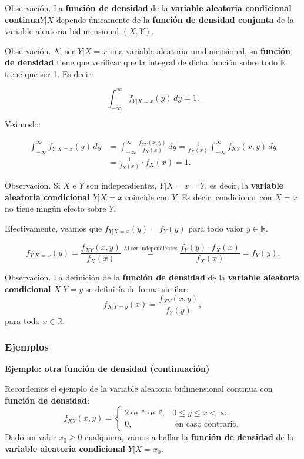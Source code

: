 \documentclass[]{book}
\begin{document}
Observación.
La \textbf{función de densidad} de la \textbf{variable aleatoria condicional continua\(Y|X\)} depende únicamente de la \textbf{función de densidad conjunta} de la variable aleatoria bidimensional \((X,Y)\).

Observación.
Al ser \(Y|X=x\) una variable aleatoria unidimensional, su \textbf{función de densidad} tiene que verificar que la integral de dicha función sobre todo \(\mathbb{R}\) tiene que ser 1. Es decir:

\[
\int_{-\infty}^\infty f_{Y|X=x}(y)\, dy=1.
\]

Veámoslo:

\[
\begin{array}{rl}
\int_{-\infty}^\infty f_{Y|X=x}(y)\, dy & =\int_{-\infty}^\infty \frac{f_{XY}(x,y)}{f_X(x)}\, dy=\frac{1}{f_X(x)}\int_{-\infty}^\infty f_{XY}(x,y)\, dy\\
& = \frac{1}{f_X(x)}\cdot f_X(x) =1.
\end{array}
\]

Observación.
Si \(X\) e \(Y\) son independientes, \(Y|X=x =Y\), es decir, la \textbf{variable aleatoria condicional \(Y|X=x\)} coincide con \(Y\). Es decir, condicionar con \(X=x\) no tiene ningún efecto sobre \(Y\).

Efectivamente, veamos que \(f_{Y|X=x}(y)=f_Y(y)\) para todo valor \(y\in\mathbb{R}.\)

\[
f_{Y|X=x}(y) =\displaystyle \frac{f_{XY}(x,y)}{f_X(x)} \stackrel{\mbox{Al ser independientes}}{=}\frac{f_Y(y)\cdot f_X(x)}{f_X(x)}=f_Y(y).
\]

Observación.
La definición de la \textbf{función de densidad} de la \textbf{variable aleatoria condicional \(X|Y=y\)} se definiría de forma similar:
\[
f_{X|Y=y}(x)=\frac{f_{XY}(x,y)}{f_Y(y)},
\]
para todo \(x\in\mathbb{R}\).

\hypertarget{ejemplos-7}{%
\subsubsection{Ejemplos}\label{ejemplos-7}}

\textbf{Ejemplo: otra función de densidad (continuación)}

Recordemos el ejemplo de la variable aleatoria bidimensional continua con \textbf{función de densidad}:
\[
f_{XY}(x,y)=\begin{cases}
2 \cdot \mathrm{e}^{-x}\cdot \mathrm{e}^{-y}, & 0\leq y\leq x < \infty,\\
0, & \mbox{ en caso contrario,}
\end{cases}
\]
Dado un valor \(x_0\geq 0\) cualquiera, vamos a hallar la \textbf{función de densidad} de la \textbf{variable aleatoria condicional} \(Y|X=x_0\).
\end{document}
